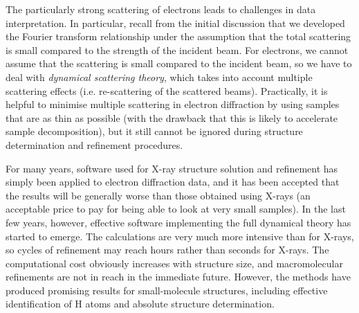 \documentclass{article}
\theoremstyle{plain}\theoremheaderfont{\normalfont\itshape}\theorembodyfont{\rmfamily}\theoremseparator{.}\newtheorem*{rem}{Remark}\newtheorem*{ex}{Example}\newtheorem*{proof}{Proof}\newtheorem*{altp}{Alternative proof}
\theoremstyle{plain}\theoremheaderfont{\normalfont\bfseries}\theorembodyfont{\rmfamily}\theoremseparator{.}\newtheorem{thm}{Theorem}[section]\newtheorem{lem}[thm]{Lemma}\newtheorem{prop}[thm]{Proposition}\newtheorem*{cor}{Corollary}\newtheorem{defn}[thm]{Definition}\newtheorem{clm}[thm]{Claim}\newtheorem{clminproof}{Claim}\newtheorem*{law}{Law}\newtheorem{pos}[thm]{Postulate}
\theoremstyle{break}\theoremheaderfont{\normalfont\itshape}\theorembodyfont{\rmfamily}\theoremseparator{.\medskip}\newtheorem*{proofskip}{Proof}\newtheorem*{exs}{Examples}\newtheorem*{rems}{Remarks}
\theoremstyle{break}\theoremheaderfont{\normalfont\bfseries}\theorembodyfont{\rmfamily}\theoremseparator{.\medskip}\newtheorem{lemskip}[thm]{Lemma}\newtheorem{defnskip}[thm]{Definition}\newtheorem{propskip}[thm]{Proposition}\newtheorem{thmskip}[thm]{Theorem}
\numberwithin{equation}{section}
\begin{document}
    The particularly strong scattering of electrons leads to challenges in data interpretation. In particular, recall from the initial discussion that we developed the Fourier transform relationship under the assumption that the total scattering is small compared to the strength of the incident beam. For electrons, we cannot assume that the scattering is small compared to the incident beam, so we have to deal with \textit{dynamical scattering theory}, which takes into account multiple scattering effects (i.e. re-scattering of the scattered beams). Practically, it is helpful to minimise multiple scattering in electron diffraction by using samples that are as thin as possible (with the drawback that this is likely to accelerate sample decomposition), but it still cannot be ignored during structure determination and refinement procedures.
    
    For many years, software used for X-ray structure solution and refinement has simply been applied to electron diffraction data, and it has been accepted that the results will be generally worse than those obtained using X-rays (an acceptable price to pay for being able to look at very small samples). In the last few years, however, effective software implementing the full dynamical theory has started to emerge. The calculations are very much more intensive than for X-rays, so cycles of refinement may reach hours rather than seconds for X-rays. The computational cost obviously increases with structure size, and macromolecular refinements are not in reach in the immediate future. However, the methods have produced promising results for small-molecule structures, including effective identification of H atoms and absolute structure determination.
\end{document}
